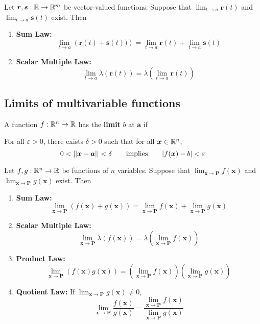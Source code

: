    


\begin{theorem}
    Let $\bm{r},\bm{s} : \mathbb{R} \to \mathbb{R}^m$ be vector-valued functions. Suppose that $\lim_{t \to a}\bm{r}(t)$ and $\lim_{t \to a}\bm{s}(t)$ exist. Then 
    
    \begin{enumerate}
        \item \textbf{Sum Law:} $$\lim_{t \to a} \left(\bm{r}(t) + \bm{s}(t))\right) = \lim_{t \to a} \bm{r}(t) + \lim_{t \to a} \bm{s}(t)$$
        \item \textbf{Scalar Multiple Law:} $$\lim_{t \to a} \lambda(\bm{r}(t)) = \lambda \left(\lim_{t \to a} \bm{r}(t) \right)$$
    \end{enumerate}
    
    
    \end{theorem}



\subsection{Limits of multivariable functions}\label{limmulti}

\begin{definition}
    A function $f : \mathbb{R}^n \to \mathbb{R}$ has the \textbf{limit} $b$ at $\bm{a}$ if
    
    \vspace{1em}
    For all $\varepsilon>0$, there exists $\delta > 0$ such that for all $\bm{x} \in \mathbb{R}^n$, $$0 < ||\bm{x} - \bm{a} || < \delta \qquad \textnormal{implies} \qquad |f(\bm{x}) - b | < \varepsilon$$
    \end{definition}

\begin{theorem}\label{limmultirules}
     Let $f,g : \mathbb{R}^n \to \mathbb{R}$ be functions of $n$ variables. Suppose that $\lim_{\bm{x} \to \bm{P}}f(\bm{x})$ and $\lim_{\bm{x} \to \bm{P}}g(\bm{x})$ exist. Then 
    
    \begin{enumerate}
        \item \textbf{Sum Law:} $$\lim_{\bm{x} \to \bm{P}} \left(f(\bm{x}) + g(\bm{x})\right) = \lim_{\bm{x} \to \bm{P}} f(\bm{x}) + \lim_{\bm{x} \to \bm{P}} g(\bm{x})$$
        \item \textbf{Scalar Multiple Law:} $$\lim_{\bm{x} \to \bm{P}} \lambda(f(\bm{x})) = \lambda \left(\lim_{\bm{x} \to \bm{P}} f(\bm{x}) \right)$$
        \item \textbf{Product Law:} $$\lim_{\bm{x} \to \bm{P}} \left(f(\bm{x})g(\bm{x})\right) = \left(\lim_{\bm{x} \to \bm{P}}f(\bm{x})\right)\left(\lim_{\bm{x} \to \bm{P}} g(\bm{x})\right)$$
        \item \textbf{Quotient Law:} If $\lim_{\bm{x} \to \bm{P}} g(\bm{x})\neq 0$, $$\lim_{\bm{x} \to \bm{P}} \frac{f(\bm{x})}{g(\bm{x})} = \frac{\lim_{\bm{x} \to \bm{P}}f(\bm{x})}{\lim_{\bm{x} \to \bm{P}} g(\bm{x})}$$
    \end{enumerate}
    
    
    \end{theorem}

